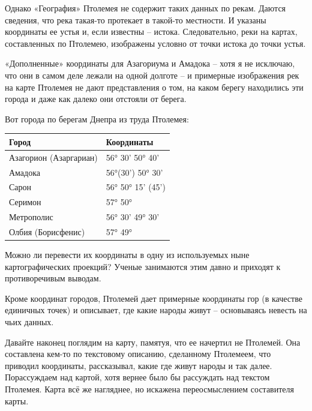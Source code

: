 Однако «География» Птолемея не содержит таких данных по рекам. Даются сведения, что река такая-то протекает в такой-то местности. И указаны координаты ее устья и, если известны – истока. Следовательно, реки на картах, составленных по Птолемею, изображены условно от точки истока до точки устья.

«Дополненные» координаты для Азагориума и Амадока – хотя я не исключаю, что они в самом деле лежали на одной долготе – и примерные изображения рек на карте Птолемея не дают представления о том, на каком берегу находились эти города и даже как далеко они отстояли от берега.

Вот города по берегам Днепра из труда Птолемея:

\begin{longtable}{l|l}
Город & Координаты\\ \hline
Азагорион (Азаргариан) & 56° 30'  50° 40'\\
Амадока & 56°(30') 50° 30'\\
Сарон & 56° 50° 15' (45')\\
Серимон & 57° 50°\\
Метрополис & 56° 30' 49° 30'\\
Олбия (Борисфенис) & 57° 49°\\
\end{longtable}


Можно ли перевести их координаты в одну из используемых ныне картографических проекций? Ученые занимаются этим давно и приходят к противоречивым выводам.

Кроме координат городов, Птолемей дает примерные координаты гор (в качестве единичных точек) и описывает, где какие народы живут – основываясь невесть на чьих данных.%

Давайте наконец поглядим на карту, памятуя, что ее начертил не Птолемей. Она составлена кем-то по текстовому описанию, сделанному Птолемеем, что приводил координаты, рассказывал, какие где живут народы и так далее. Порассуждаем над картой, хотя вернее было бы рассуждать над текстом Птолемея. Карта всё же нагляднее, но искажена переосмыслением составителя карты. 

